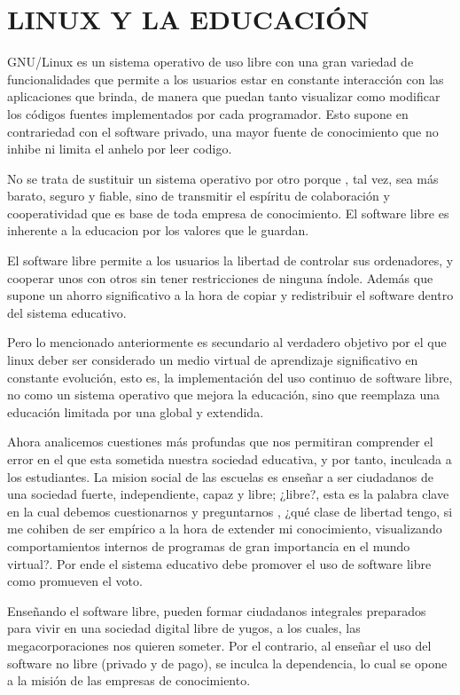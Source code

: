 \chapter*{LINUX Y LA EDUCACIÓN}
GNU/Linux es un sistema operativo de uso libre con una gran
variedad de funcionalidades que permite a los usuarios estar en
constante interacción con las aplicaciones que brinda, de
manera que puedan tanto visualizar como modificar los códigos
fuentes implementados por cada programador. Esto supone en
contrariedad con el software privado, una mayor fuente de
conocimiento que no inhibe ni limita el anhelo por leer codigo.

No se trata de sustituir un sistema operativo por otro porque ,
tal vez, sea más barato, seguro y fiable, sino de transmitir el
espíritu de colaboración y cooperatividad que es base de toda
empresa de conocimiento. El software libre es inherente a la
educacion por los valores que le guardan.

El software libre permite a los usuarios la libertad de controlar
sus ordenadores, y cooperar unos con otros sin tener
restricciones de ninguna índole. Además que supone un ahorro
significativo a la hora de copiar y redistribuir el software dentro
del sistema educativo.

Pero lo mencionado anteriormente es secundario al verdadero
objetivo por el que linux deber ser considerado un medio virtual
de aprendizaje significativo en constante evolución, esto es, la
implementación del uso continuo de software libre, no como un
sistema operativo que mejora la educación, sino que reemplaza
una educación limitada por una global y extendida.

Ahora analicemos cuestiones más profundas que nos permitiran
comprender el error en el que esta sometida nuestra sociedad
educativa, y por tanto, inculcada a los estudiantes.
La mision social de las escuelas es enseñar a ser ciudadanos de
una sociedad fuerte, independiente, capaz y libre; ¿libre?, esta
es la palabra clave en la cual debemos cuestionarnos y
preguntarnos , ¿qué clase de libertad tengo, si me cohiben de
ser empírico a la hora de extender mi conocimiento, visualizando
comportamientos internos de programas de gran importancia en
el mundo virtual?. Por ende el sistema educativo debe promover
el uso de software libre como promueven el voto.

Enseñando el software libre, pueden formar ciudadanos
integrales preparados para vivir en una sociedad digital libre de
yugos, a los cuales, las megacorporaciones nos quieren someter.
Por el contrario, al enseñar el uso del software no libre (privado
y de pago), se inculca la dependencia, lo cual se opone a la
misión de las empresas de conocimiento.

